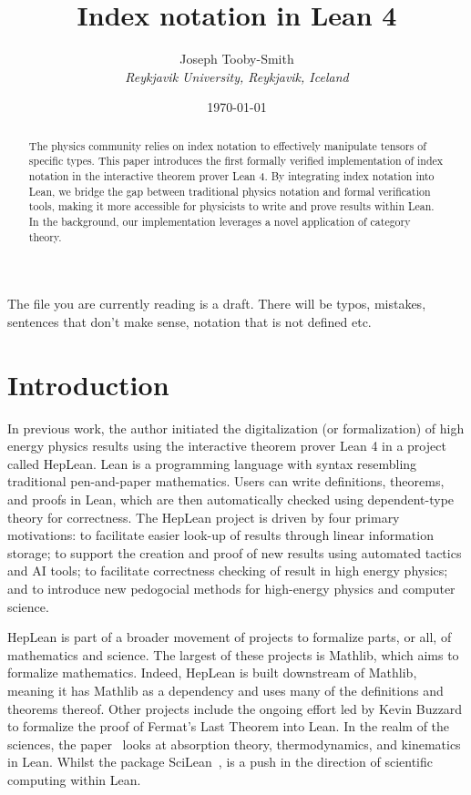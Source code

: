 \documentclass[a4paper, 11pt]{article}
\title{Index notation in Lean 4}
\author{Joseph Tooby-Smith \\ \textit{Reykjavik University, Reykjavik, Iceland}}
\date{\today}
\begin{document}
\maketitle
\vspace{-1cm}
\begin{abstract}
The physics community relies on index notation to effectively manipulate tensors of specific 
types. This paper introduces the first formally verified implementation of index notation in the
interactive theorem prover Lean 4. By integrating index notation into Lean, we bridge the gap between 
traditional physics notation and formal verification tools, 
making it more accessible for physicists to write and prove results within Lean.
In the background, our implementation leverages a novel application of category theory.
\end{abstract}

{\color{mycolor} The file you are currently reading is a draft. There will 
be typos, mistakes, sentences that don't make sense, notation that is not defined etc.}
\section{Introduction}

In previous work, the author initiated the digitalization (or formalization) 
of high energy physics 
results using the interactive theorem prover Lean 4 in a project called HepLean. 
Lean is a
programming language with syntax resembling traditional pen-and-paper mathematics. 
Users can write definitions, theorems, and proofs in Lean,
which are then automatically checked using dependent-type theory for correctness.
The HepLean project is driven by four primary motivations: to facilitate easier look-up of results
 through linear information storage; to support the creation and proof of new results using 
 automated tactics and AI tools; to facilitate correctness checking of result in high energy physics; 
 and to introduce new pedogocial methods for high-energy physics and computer science.

HepLean is part of a broader movement of projects
to formalize parts, or all, of 
mathematics and science. The largest of these projects is Mathlib, which aims to formalize
mathematics. Indeed, HepLean is built downstream of Mathlib, meaning it has Mathlib as a 
dependency and uses many of the definitions and theorems thereof. 
Other projects include the ongoing effort led by Kevin Buzzard to formalize the proof of Fermat's
Last Theorem into Lean. 
In the realm of the sciences, the paper~\cite{josephson} looks at absorption theory, thermodynamics, and kinematics in Lean. 
Whilst the package SciLean~\cite{SciLean}, is a push in the direction of scientific computing within Lean. 
\end{document}
